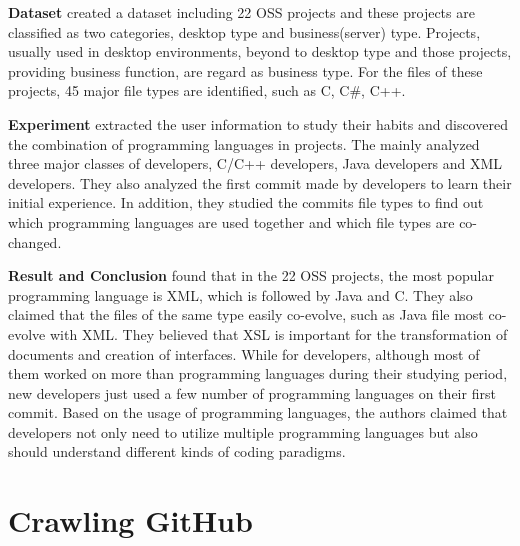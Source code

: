 \documentclass[12pt,oneside,final]{vlsithesis}
\begin{document}
\textbf{Dataset}
\citet{karus2011study} created a dataset including 22 OSS projects and these projects are classified as two categories, desktop type and business(server) type. Projects, usually used in desktop environments, beyond to desktop type and those projects, providing business function, are regard as business type. For the files of these projects, 45 major file types are identified, such as C, C\#, C++. 

\textbf{Experiment}
\citet{karus2011study} extracted the user information to study their habits and discovered the combination of programming languages in projects. The mainly analyzed three major classes of developers, C/C++ developers, Java developers and XML developers. They also analyzed  the first commit made by developers to learn their initial experience. In addition, they studied the commits file types to find out which programming languages are used together and which file types are co-changed. 

\textbf{Result and Conclusion}
\citet{karus2011study} found that in the 22 OSS projects, the most popular programming language is XML, which is followed by Java and C. They also claimed that the files of the same type easily co-evolve, such as Java file most co-evolve with XML. They believed that XSL is important for the transformation of documents and creation of interfaces. While for developers, although most of them worked on more than programming languages during their studying period, new developers  just used a few number of programming languages on their first commit. Based on the usage of programming languages, the authors claimed that developers not only need to utilize multiple programming languages but also should understand different kinds of coding paradigms. 
\chapter{Crawling GitHub}\label{chapter:dataset}
\end{document}
